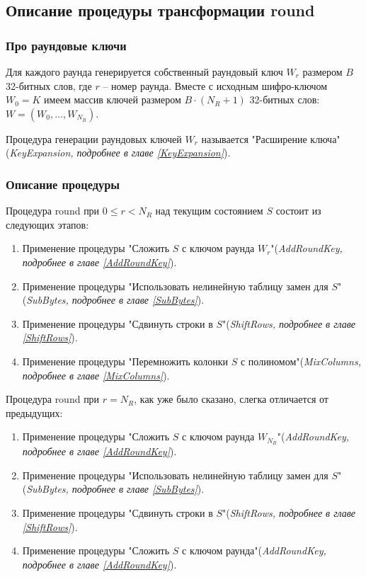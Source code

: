 \subsection{Описание процедуры трансформации round} \label{Round}

\subsubsection{Про раундовые ключи}
    Для каждого раунда генерируется собственный раундовый ключ $W_{r}$ размером $B$ 32-битных слов,
    где $r$ -- номер раунда.
    Вместе с исходным шифро-ключом $W_{0} = K$ имеем массив ключей размером $B \cdot (N_R + 1)$ 32-битных слов:
    $W = (W_{0}, \dots, W_{N_R})$.

    Процедура генерации раундовых ключей $W_{r}$ называется "Расширение ключа" \\
    (\textit{KeyExpansion, подробнее в главе \ref{KeyExpansion}}).

    \subsubsection{Описание процедуры} \label{RoundDescription}
    Процедура round при $0 \leq r < N_R$ над текущим состоянием $S$ состоит из следующих этапов:
    \begin{enumerate}
        \item Применение процедуры "Сложить $S$ с ключом раунда $W_{r}$"\;(\textit{AddRoundKey, подробнее в главе \ref{AddRoundKey}}).
        \item Применение процедуры "Использовать нелинейную таблицу замен для $S$"\;(\textit{SubBytes, подробнее в главе \ref{SubBytes}}).
        \item Применение процедуры "Сдвинуть строки в $S$"\;(\textit{ShiftRows, подробнее в главе \ref{ShiftRows}}).
        \item Применение процедуры "Перемножить колонки $S$ с полиномом"\;(\textit{MixColumns, подробнее в главе \ref{MixColumns}}).
    \end{enumerate}

    Процедура round при $r = N_R$, как уже было сказано, слегка отличается от предыдущих:
    \begin{enumerate}
        \item Применение процедуры "Сложить $S$ с ключом раунда $W_{N_R}$"\;(\textit{AddRoundKey, подробнее в главе \ref{AddRoundKey}}).
        \item Применение процедуры "Использовать нелинейную таблицу замен для $S$"\;(\textit{SubBytes, подробнее в главе \ref{SubBytes}}).
        \item Применение процедуры "Сдвинуть строки в $S$"\;(\textit{ShiftRows, подробнее в главе \ref{ShiftRows}}).
        \item Применение процедуры "Сложить $S$ с ключом раунда"\;(\textit{AddRoundKey, подробнее в главе \ref{AddRoundKey}}).
    \end{enumerate}

